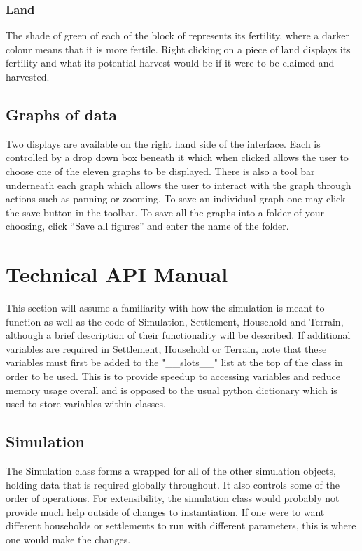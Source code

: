 \documentclass[12pt]{article}
\begin{document}
			\subsubsection{Land}
				The shade of green of each of the block of represents its fertility, where a darker colour means that it is more fertile. Right clicking on a piece of land displays its fertility and what its potential harvest would be if it were to be claimed and harvested.
				
		\subsection{Graphs of data}
			Two displays are available on the right hand side of the interface. Each is controlled by a drop down box beneath it which when clicked allows the user to choose one of the eleven graphs to be displayed. There is also a tool bar underneath each graph which allows the user to interact with the graph through actions such as panning or zooming. To save an individual graph one may click the save button in the toolbar. To save all the graphs into a folder of your choosing, click “Save all figures” and enter the name of the folder. 
			
	\section{Technical API Manual}
		This section will assume a familiarity with how the simulation is meant to function as well as the code of Simulation, Settlement, Household and Terrain, although a brief description of their functionality will be described. If additional variables are required in Settlement, Household or Terrain, note that these variables must first be added to the "\_\_slots\_\_" list at the top of the class in order to be used. This is to provide speedup to accessing variables and reduce memory usage overall and is opposed to the usual python dictionary which is used to store variables within classes.
			\subsection{Simulation}
				The Simulation class forms a wrapped for all of the other simulation objects, holding data that is required globally throughout. It also controls some of the order of operations. For extensibility, the simulation class would probably not provide much help outside of changes to instantiation. If one were to want different households or settlements to run with different parameters, this is where one would make the changes.
\end{document}

